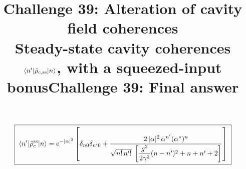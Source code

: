 \documentclass[11pt,a4paper]{article}
\title{\bfseries Challenge 39: Alteration of cavity field coherences\\[2pt]
\large Steady-state cavity coherences $\bra{n'}\hat\rho_{c,\rm ss}\ket{n}$,
with a squeezed-input bonus}
\author{}
\date{}
\title{Challenge 39: Final answer}
\author{}
\newcommand{\ket}[1]{\lvert #1\rangle}
\newcommand{\bra}[1]{\langle #1\rvert}
\newcommand{\rhoc}{\hat\rho_{c}}
\newcommand{\ee}{\mathrm{e}}
\begin{document}
\maketitle
\begin{equation}
  \boxed{\;
  \bra{n'}\rhoc^{\rm ss}\ket{n}
  =\ee^{-|\alpha|^{2}}\left[\delta_{n0}\delta_{n'0}
  +\frac{2\,|\alpha|^{2}\,\alpha^{n'}(\alpha^{*})^{n}}
  {\sqrt{n!\,n'!}\;\left[\dfrac{g^{2}}{2\gamma^{2}}(n-n')^{2}+n+n'+2\right]}
  \right]\;}
  \label{eq:coherent}
\end{equation}
\end{document}

